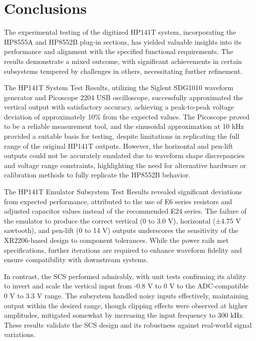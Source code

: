 \documentclass[class=report,11pt,crop=false]{standalone}
\begin{document}
\chapter{Conclusions \label{ch:conclusions}}

The experimental testing of the digitized HP141T system, incorporating the HP8555A and HP8552B plug-in sections, has yielded valuable insights into its performance and alignment with the specified functional requirements. The results demonstrate a mixed outcome, with significant achievements in certain subsystems tempered by challenges in others, necessitating further refinement.

The HP141T System Test Results, utilizing the Siglent SDG1010 waveform generator and Picoscope 2204 USB oscilloscope, successfully approximated the vertical output with satisfactory accuracy, achieving a peak-to-peak voltage deviation of approximately 10\% from the expected values. The Picoscope proved to be a reliable measurement tool, and the sinusoidal approximation at 10 kHz provided a suitable basis for testing, despite limitations in replicating the full range of the original HP141T outputs. However, the horizontal and pen-lift outputs could not be accurately emulated due to waveform shape discrepancies and voltage range constraints, highlighting the need for alternative hardware or calibration methods to fully replicate the HP8552B behavior.

The HP141T Emulator Subsystem Test Results revealed significant deviations from expected performance, attributed to the use of E6 series resistors and adjusted capacitor values instead of the recommended E24 series. The failure of the emulator to produce the correct vertical (0 to 3.0 V), horizontal (±4.75 V sawtooth), and pen-lift (0 to 14 V) outputs underscores the sensitivity of the XR2206-based design to component tolerances. While the power rails met specifications, further iterations are required to enhance waveform fidelity and ensure compatibility with downstream systems.

In contrast, the SCS performed admirably, with unit tests confirming its ability to invert and scale the vertical input from -0.8 V to 0 V to the ADC-compatible 0 V to 3.3 V range. The subsystem handled noisy inputs effectively, maintaining output within the desired range, though clipping effects were observed at higher amplitudes, mitigated somewhat by increasing the input frequency to 300 kHz. These results validate the SCS design and its robustness against real-world signal variations.
\end{document}
